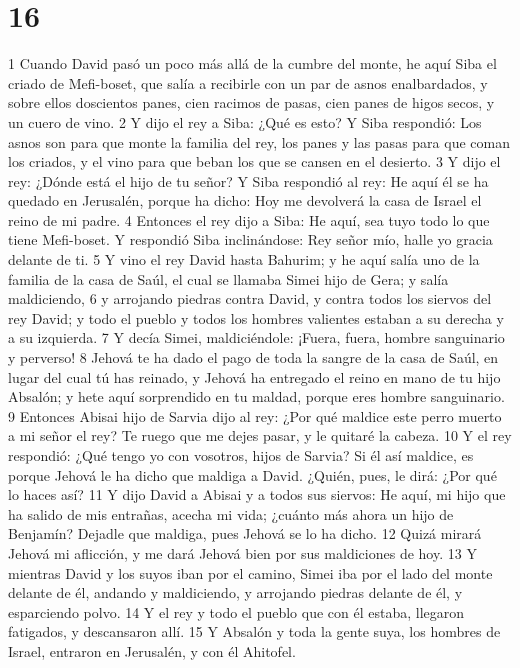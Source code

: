 \chapter{16}

1 Cuando David pasó un poco más allá de la cumbre del monte, he aquí Siba el criado de Mefi-boset, que salía a recibirle con un par de asnos enalbardados, y sobre ellos doscientos panes, cien racimos de pasas, cien panes de higos secos, y un cuero de vino.
2 Y dijo el rey a Siba: ¿Qué es esto? Y Siba respondió: Los asnos son para que monte la familia del rey, los panes y las pasas para que coman los criados, y el vino para que beban los que se cansen en el desierto.
3 Y dijo el rey: ¿Dónde está el hijo de tu señor? Y Siba respondió al rey: He aquí él se ha quedado en Jerusalén, porque ha dicho: Hoy me devolverá la casa de Israel el reino de mi padre.
4 Entonces el rey dijo a Siba: He aquí, sea tuyo todo lo que tiene Mefi-boset. Y respondió Siba inclinándose: Rey señor mío, halle yo gracia delante de ti.
5 Y vino el rey David hasta Bahurim; y he aquí salía uno de la familia de la casa de Saúl, el cual se llamaba Simei hijo de Gera; y salía maldiciendo,
6 y arrojando piedras contra David, y contra todos los siervos del rey David; y todo el pueblo y todos los hombres valientes estaban a su derecha y a su izquierda.
7 Y decía Simei, maldiciéndole: ¡Fuera, fuera, hombre sanguinario y perverso!
8 Jehová te ha dado el pago de toda la sangre de la casa de Saúl, en lugar del cual tú has reinado, y Jehová ha entregado el reino en mano de tu hijo Absalón; y hete aquí sorprendido en tu maldad, porque eres hombre sanguinario.
9 Entonces Abisai hijo de Sarvia dijo al rey: ¿Por qué maldice este perro muerto a mi señor el rey? Te ruego que me dejes pasar, y le quitaré la cabeza.
10 Y el rey respondió: ¿Qué tengo yo con vosotros, hijos de Sarvia? Si él así maldice, es porque Jehová le ha dicho que maldiga a David. ¿Quién, pues, le dirá: ¿Por qué lo haces así?
11 Y dijo David a Abisai y a todos sus siervos: He aquí, mi hijo que ha salido de mis entrañas, acecha mi vida; ¿cuánto más ahora un hijo de Benjamín? Dejadle que maldiga, pues Jehová se lo ha dicho.
12 Quizá mirará Jehová mi aflicción, y me dará Jehová bien por sus maldiciones de hoy.
13 Y mientras David y los suyos iban por el camino, Simei iba por el lado del monte delante de él, andando y maldiciendo, y arrojando piedras delante de él, y esparciendo polvo.
14 Y el rey y todo el pueblo que con él estaba, llegaron fatigados, y descansaron allí.
15 Y Absalón y toda la gente suya, los hombres de Israel, entraron en Jerusalén, y con él Ahitofel.
